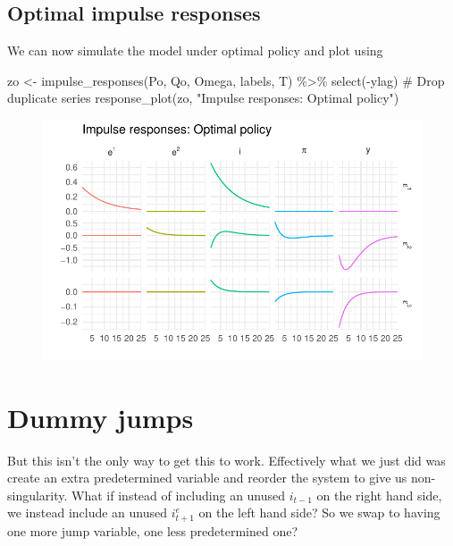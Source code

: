 \documentclass[
  letterpaper,
]{book}
\newenvironment{Shaded}{\begin{snugshade}}{\end{snugshade}}
\newcommand{\CommentTok}[1]{\textcolor[rgb]{0.37,0.37,0.37}{#1}}
\newcommand{\FunctionTok}[1]{\textcolor[rgb]{0.28,0.35,0.67}{#1}}
\newcommand{\NormalTok}[1]{\textcolor[rgb]{0.00,0.23,0.31}{#1}}
\newcommand{\OtherTok}[1]{\textcolor[rgb]{0.00,0.23,0.31}{#1}}
\newcommand{\SpecialCharTok}[1]{\textcolor[rgb]{0.37,0.37,0.37}{#1}}
\newcommand{\StringTok}[1]{\textcolor[rgb]{0.13,0.47,0.30}{#1}}
\begin{document}
\hypertarget{optimal-impulse-responses}{%
\subsection{Optimal impulse responses}\label{optimal-impulse-responses}}

We can now simulate the model under optimal policy and plot using

\begin{Shaded}
\begin{Highlighting}[]
\NormalTok{zo }\OtherTok{\textless{}{-}} \FunctionTok{impulse\_responses}\NormalTok{(Po, Qo, Omega, labels, T) }\SpecialCharTok{\%\textgreater{}\%}
  \FunctionTok{select}\NormalTok{(}\SpecialCharTok{{-}}\NormalTok{ylag) }\CommentTok{\# Drop duplicate series}
\FunctionTok{response\_plot}\NormalTok{(zo, }\StringTok{"Impulse responses: Optimal policy"}\NormalTok{)}
\end{Highlighting}
\end{Shaded}

\begin{figure}[H]

{\centering \includegraphics{./BK_files/figure-pdf/unnamed-chunk-26-1.pdf}

}

\end{figure}

\hypertarget{dummy-jumps}{%
\section{Dummy jumps}\label{dummy-jumps}}

But this isn't the only way to get this to work. Effectively what we
just did was create an extra predetermined variable and reorder the
system to give us non-singularity. What if instead of including an
unused \(i_{t-1}\) on the right hand side, we instead include an unused
\(i^e_{t+1}\) on the left hand side? So we swap to having one more jump
variable, one less predetermined one?
\end{document}
